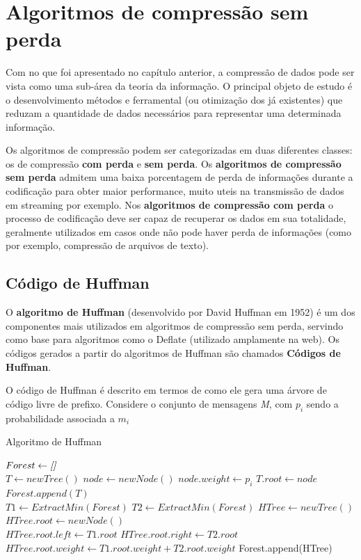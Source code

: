 \chapter{Algoritmos de compressão sem perda}

Com no que foi apresentado no capítulo anterior, a compressão de dados pode ser vista como uma sub-área da teoria da informação. O principal objeto de estudo é o desenvolvimento métodos e ferramental (ou otimização dos já existentes) que reduzam a quantidade de dados necessários para representar uma determinada informação.

Os algoritmos de compressão podem ser categorizadas em duas diferentes classes: os de compressão \textbf{com perda} e \textbf{sem perda}. Os \textbf{algoritmos de compressão sem perda} admitem uma baixa porcentagem de perda de informações durante a codificação para obter maior performance, muito uteis na transmissão de dados em streaming por exemplo. Nos \textbf{algoritmos de compressão com perda} o processo de codificação deve ser capaz de recuperar os dados em sua totalidade, geralmente utilizados em casos onde não pode haver perda de informações (como por exemplo, compressão de arquivos de texto).

\pagebreak

\section{Código de Huffman} \label{sec:huff}
O \textbf{algoritmo de Huffman} (desenvolvido por David Huffman em 1952) é um dos componentes mais utilizados em algoritmos de compressão sem perda, servindo como base para algoritmos como o Deflate (utilizado amplamente na web).
Os códigos gerados a partir do algoritmos de Huffman são chamados \textbf{Códigos de Huffman}.

O código de Huffman é descrito em termos de como ele gera uma árvore de código livre de prefixo. Considere o conjunto de mensagens \emph{M}, com $p_i$ sendo a probabilidade associada a $m_i$

\begin{algorithm}[H]
\caption{Algoritmo de Huffman} \label{alg:huff}
\begin{algorithmic}
	\State $Forest \gets \emph{[]}$\\
	 
		\State $T \gets newTree()$
		\State $node \gets newNode()$
		\State $node.weight \gets p_i$ 
		\State $T.root \gets node$
		\State $Forest.append(T)$ 
	\EndFor \\
	
		\State $T1 \gets ExtractMin(Forest)$ 
		\State $T2 \gets ExtractMin(Forest)$
		\State $HTree \gets newTree()$
		\State $HTree.root \gets newNode()$ \\
		\State $HTree.root.left \gets T1.root$
		\State $HTree.root.right \gets T2.root$
		\State $HTree.root.weight \gets T1.root.weight + T2.root.weight$
		\State Forest.append(HTree) 
	\EndWhile
\end{algorithmic}
\end{algorithm}

